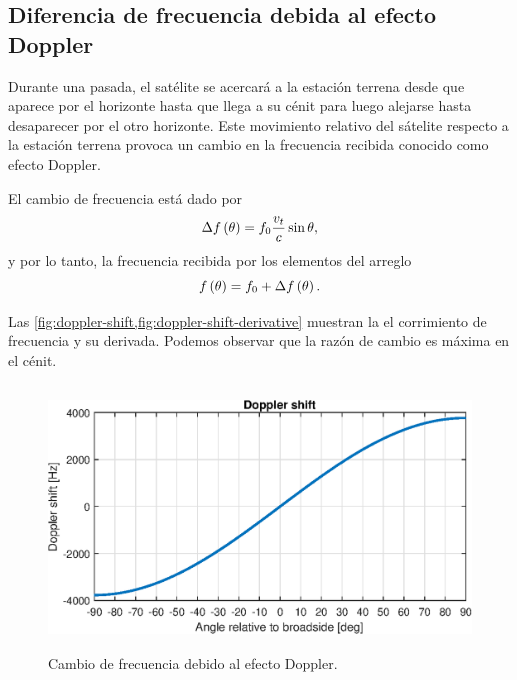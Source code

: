 \documentclass{article}
\newenvironment{standalone}{\begin{preview}}{\end{preview}}
\begin{document}
\begin{standalone}
  \subsection{Diferencia de frecuencia debida al efecto Doppler}

  Durante una pasada, el satélite se acercará a la estación terrena desde que aparece por el horizonte hasta que llega a su cénit para luego alejarse hasta desaparecer por el otro horizonte. Este movimiento relativo del sátelite respecto a la estación terrena provoca un cambio en la frecuencia recibida conocido como efecto Doppler.

  El cambio de frecuencia está dado por \cite{popescu2016}
  \begin{equation}
    \Delta f \left( \theta \right) = f_0 \frac{v_t}{c} \sin{\theta},
    \tagaddtext{[\si{\hertz}]}
  \end{equation}
  y por lo tanto, la frecuencia recibida por los elementos del arreglo
  \begin{equation}
    f \left( \theta \right) = f_0 + \Delta f \left( \theta \right).
    \tagaddtext{[\si{\hertz}]}
  \end{equation}

  Las \cref{fig:doppler-shift,fig:doppler-shift-derivative} muestran la el corrimiento de frecuencia y su derivada. Podemos observar que la razón de cambio es máxima en el cénit.

  \begin{figure}[!htbp]
    \centering
    \includegraphics[width=\linewidth, height=70mm, keepaspectratio]{../images/doppler-shift.eps}
    \caption{Cambio de frecuencia debido al efecto Doppler.}
    \label{fig:doppler-shift}
  \end{figure}


\end{standalone}
\end{document}
